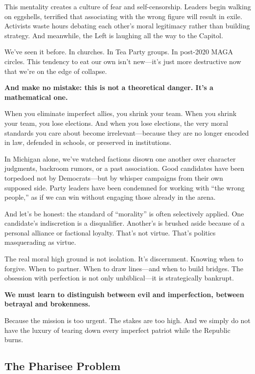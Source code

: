 This mentality creates a culture of fear and self-censorship. Leaders begin walking on eggshells, terrified that associating with the wrong figure will result in exile. Activists waste hours debating each other's moral legitimacy rather than building strategy. And meanwhile, the Left is laughing all the way to the Capitol.

We’ve seen it before. In churches. In Tea Party groups. In post-2020 MAGA circles. This tendency to eat our own isn't new—it’s just more destructive now that we're on the edge of collapse. 

\textbf{And make no mistake: this is not a theoretical danger. It's a mathematical one.}

When you eliminate imperfect allies, you shrink your team. When you shrink your team, you lose elections. And when you lose elections, the very moral standards you care about become irrelevant—because they are no longer encoded in law, defended in schools, or preserved in institutions.

In Michigan alone, we’ve watched factions disown one another over character judgments, backroom rumors, or a past association. Good candidates have been torpedoed not by Democrats—but by whisper campaigns from their own supposed side. Party leaders have been condemned for working with ``the wrong people,'' as if we can win without engaging those already in the arena.

And let’s be honest: the standard of ``morality'' is often selectively applied. One candidate’s indiscretion is a disqualifier. Another’s is brushed aside because of a personal alliance or factional loyalty. That’s not virtue. That’s politics masquerading as virtue.

The real moral high ground is not isolation. It’s discernment. Knowing when to forgive. When to partner. When to draw lines—and when to build bridges. The obsession with perfection is not only unbiblical—it is strategically bankrupt.

\textbf{We must learn to distinguish between evil and imperfection, between betrayal and brokenness.}

Because the mission is too urgent. The stakes are too high. And we simply do not have the luxury of tearing down every imperfect patriot while the Republic burns.






\subsection*{The Pharisee Problem}

